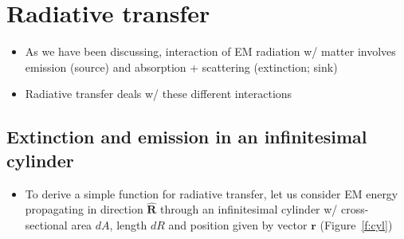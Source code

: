 \documentclass[11pt, oneside]{article}
\newcommand{\rv}{\mathbf{r}}
\newcommand{\Rh}{\hat{\mathbf{R}}}
\begin{document}
\section{Radiative transfer}
\label{s:rt}

\begin{itemize}
	\item As we have been discussing, interaction of EM radiation w/ matter involves emission (source) and absorption + scattering (extinction; sink)
	\item Radiative transfer deals w/ these different interactions
\end{itemize}

\subsection{Extinction and emission in an infinitesimal cylinder}
\label{s:cyl}

\begin{itemize}
	\item To derive a simple function for radiative transfer, let us consider EM energy propagating in direction $\Rh$ through an infinitesimal cylinder w/ cross-sectional area $dA$, length $dR$ and position given by vector $\rv$ (Figure~\ref{f:cyl})
\end{itemize}
\end{document}
